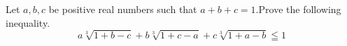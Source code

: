 Let $a,b,c$ be positive real numbers such that $a+b+c=1.$Prove the following inequality.\[ a\sqrt[3]{1+b-c}+b\sqrt[3]{1+c-a}+c\sqrt[3]{1+a-b}\leqq 1 \]